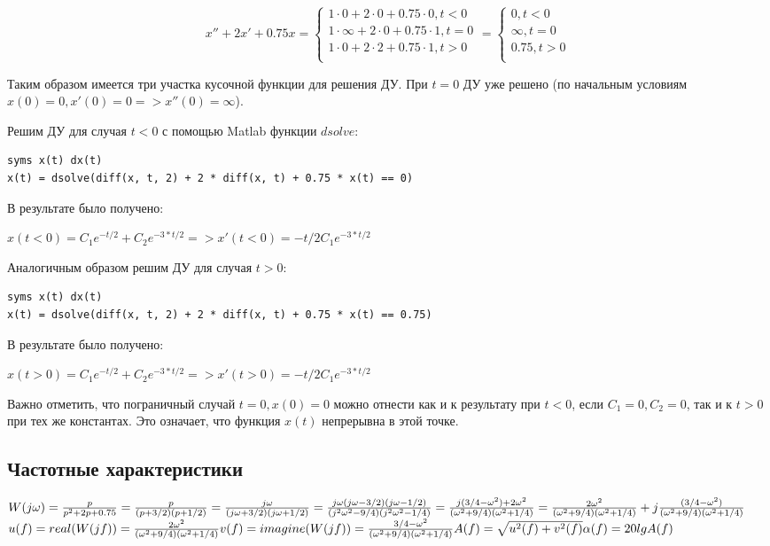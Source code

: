 \documentclass[14pt,a4paper,report]{report}
\begin{document}
\begin{equation*}
	\text{$x''+2x'+0.75x=$}
	\begin{cases}
		\text{$1\cdot0+2\cdot0+0.75\cdot0, t<0$} \\
		\text{$1\cdot\infty+2\cdot0+0.75\cdot1, t=0$} \\
		\text{$1\cdot0+2\cdot2+0.75\cdot1, t>0$} \\
	\end{cases}
	\text{$=$}
	\begin{cases}
		\text{$0, t<0$} \\
		\text{$\infty, t=0$} \\
		\text{$0.75, t>0$} \\
	\end{cases}
\end{equation*}

Таким образом имеется три участка кусочной функции для решения ДУ. При $t=0$ ДУ уже решено (по начальным условиям $x(0)=0, x'(0)=0 => x''(0)=\infty$).

Решим ДУ для случая $t<0$ с помощью Matlab функции $dsolve$:

\begin{lstlisting}
syms x(t) dx(t)
x(t) = dsolve(diff(x, t, 2) + 2 * diff(x, t) + 0.75 * x(t) == 0)
\end{lstlisting}

В результате было получено:

$x(t<0)=C_1e^{-t/2}+C_2e^{-3*t/2} => x'(t<0)=-t/2C_1e^{-3*t/2}$

Аналогичным образом решим ДУ для случая $t>0$:

\begin{lstlisting}
syms x(t) dx(t)
x(t) = dsolve(diff(x, t, 2) + 2 * diff(x, t) + 0.75 * x(t) == 0.75)
\end{lstlisting}

В результате было получено:

$x(t>0)=C_1e^{-t/2}+C_2e^{-3*t/2} => x'(t>0)=-t/2C_1e^{-3*t/2}$

Важно отметить, что пограничный случай $t=0, x(0)=0$ можно отнести как и к результату при $t<0$, если $C_1=0, C_2=0$, так и к $t>0$ при тех же константах. Это означает, что функция $x(t)$ непрерывна в этой точке.

\subsection{Частотные характеристики}

$
\\
W(j\omega)=\frac{p}{p^2+2p+0.75} = \frac{p}{(p+3/2)(p+1/2)} = \frac{j\omega}{(j\omega+3/2)(j\omega+1/2)} = \frac{j\omega(j\omega-3/2)(j\omega-1/2)}{(j^2\omega^2-9/4)(j^2\omega^2-1/4)}=\frac{j(3/4-\omega^2)+2\omega^2}{(\omega^2+9/4)(\omega^2+1/4)}=\frac{2\omega^2}{(\omega^2+9/4)(\omega^2+1/4)} + j\frac{(3/4-\omega^2)}{(\omega^2+9/4)(\omega^2+1/4)}$
$
\\
u(f)=real(W(jf))=\frac{2\omega^2}{(\omega^2+9/4)(\omega^2+1/4)}\\
v(f)=imagine(W(jf))=\frac{3/4-\omega^2}{(\omega^2+9/4)(\omega^2+1/4)}\\
A(f)=\sqrt{u^2(f) + v^2(f)}\\
\alpha(f)=20lgA(f)\\
$
\end{document}
